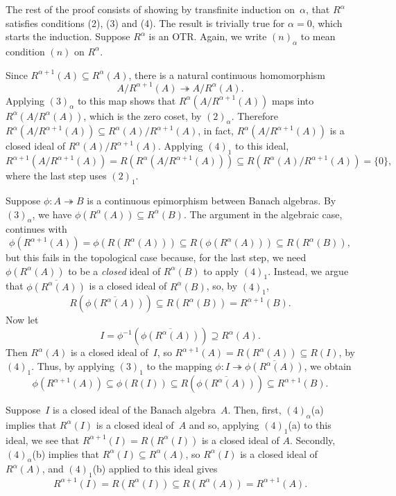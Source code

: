 \documentclass[11pt]{article}
\newcounter{arbenum}
\newenvironment{arbenumerate}{\begin{list}{{\rm(\arabic{arbenum})}}%
{\usecounter{arbenum}}}{\end{list}}
\newcommand{\sseq}{\subseteq}
\newcommand{\closure}[1]{\overline{#1}}
\newcommand{\al}{\alpha}
\newcommand{\onto}{\twoheadrightarrow}
\newenvironment{Proof}{{\it Proof. }}{}%
\begin{document}
\begin{Proof}
The rest of the proof consists of showing by transfinite induction on~$\al$,
that $R^\al$ satisfies conditions (2), (3) and (4).    The result is trivially
true for $\al = 0$, which starts the induction.   Suppose $R^\al$ is an OTR.
Again, we write $(n)_\al$ to mean condition $(n)$ on $R^\al$.
\begin{arbenumerate}
\addtocounter{arbenum}{1}
\item
Since $R^{\al+1}(A) \sseq R^\al(A)$, there is a natural continuous homomorphism
$$A/R^{\al+1}(A) \onto A/R^\al(A).$$   Applying $(3)_\al$ to this map shows that
$R^\al(A/R^{\al+1}(A))$ maps into $R^\al(A/R^\al(A))$, which is the zero coset,
by $(2)_\al$.  Therefore $R^\al(A/R^{\al+1}(A))\sseq R^\al(A)/R^{\al+1}(A)$,
in fact, $R^\al(A/R^{\al+1}(A))$ is a closed ideal of $R^\al(A)/R^{\al+1}(A)$.
Applying $(4)_1$ to this ideal,
$$R^{\al+1}(A/R^{\al+1}(A)) = R(R^\al(A/R^{\al+1}(A))) \sseq R(R^\al(A)/R^{\al+1}(A))
                                                             = \{0\},$$
where the last step uses $(2)_1$.
\item
Suppose $\phi:A \onto B$ is a continuous epimorphism between
Banach algebras.    By $(3)_\al$, we have $\phi(R^\al(A)) \sseq R^\al(B)$.
The argument in the algebraic case, continues with
$$\phi(R^{\al+1}(A)) = \phi(R(R^\al(A))) \sseq R(\phi(R^\al(A)))
                                                  \sseq R(R^\al(B)),$$
but this fails in the topological case because, for the last step, we need
$\phi(R^\al(A))$ to be a {\em closed} ideal of $R^\al(B)$ to apply $(4)_1$.
Instead, we argue that $\closure{\phi(R^\al(A))}$ is a closed ideal of
$R^\al(B)$, so, by $(4)_1$,
$$R\left(\closure{\phi(R^\al(A))}\right)\sseq R(R^\al(B)) = R^{\al+1}(B).$$
Now let
$$I = \phi^{-1}\left(\closure{\phi(R^\al(A))}\right) \supseteq R^\al(A).$$
Then $R^\al(A)$ is a closed ideal of~$I$, so $R^{\al+1}(A) = R(R^\al(A))
\sseq R(I)$, by $(4)_1$.  Thus, by applying $(3)_1$ to the mapping
$\phi:I \onto \closure{\phi(R^\al(A))}$, we obtain
$$\phi(R^{\al+1}(A)) \sseq \phi(R(I)) \sseq
  R\left(\closure{\phi(R^\al(A))}\right)\sseq R^{\al+1}(B).$$
\item
Suppose~$I$ is a closed ideal of the Banach algebra~$A$.  Then, first, $(4)_\al$(a)
implies that $R^\al(I)$ is a closed ideal of~$A$ and so, applying $(4)_1$(a)
to this ideal, we see that $R^{\al+1}(I) = R(R^\al(I))$ is a closed ideal of $A$.
Secondly, $(4)_\al$(b) implies that
$R^\al(I) \sseq R^\al(A)$, so $R^\al(I)$ is a closed ideal of $R^\al(A)$, and
$(4)_1$(b) applied to this ideal gives
$$R^{\al+1}(I) = R(R^\al(I))\sseq R(R^\al(A)) = R^{\al+1}(A).$$
\end{arbenumerate}


\end{Proof}
\end{document}
